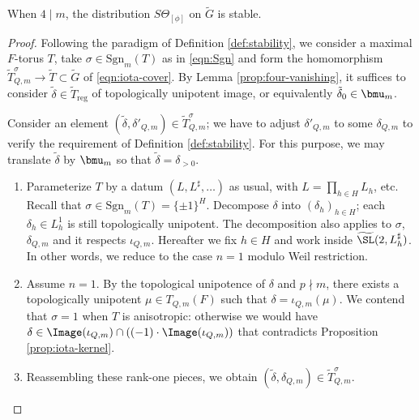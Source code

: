 \documentclass[a4paper,10pt]{article}
\begin{document}
\begin{theorem}\label{prop:stability-2}
	When $4 \mid m$, the distribution $S\Theta_{[\phi]}$ on $\tilde{G}$ is stable.
\end{theorem}
\begin{proof}
	Following the paradigm of Definition \ref{def:stability}, we consider a maximal $F$-torus $T$, take $\sigma \in \text{Sgn}_m(T)$ as in \eqref{eqn:Sgn} and form the homomorphism $\tilde{T}^\sigma_{Q,m} \to \tilde{T} \subset \tilde{G}$ of \eqref{eqn:iota-cover}. By Lemma \ref{prop:four-vanishing}, it suffices to consider $\tilde{\delta} \in \tilde{T}_\text{reg}$ of topologically unipotent image, or equivalently $\tilde{\delta}_0 \in \bmu_m$.

	Consider an element $(\tilde{\delta}, \delta'_{Q,m}) \in \tilde{T}^\sigma_{Q,m}$; we have to adjust $\delta'_{Q,m}$ to some $\delta_{Q,m}$ to verify the requirement of Definition \ref{def:stability}. For this purpose, we may translate $\tilde{\delta}$ by $\bmu_m$ so that $\tilde{\delta} = \delta_{>0}$.
	\begin{enumerate}
		\item Parameterize $T$ by a datum $(L, L^\sharp, \ldots)$ as usual, with $L = \prod_{h \in H} L_h$, etc. Recall that $\sigma \in \text{Sgn}_m(T) = \{\pm 1\}^H$. Decompose $\delta$ into $(\delta_h)_{h \in H}$; each $\delta_h \in L^1_h$ is still topologically unipotent. The decomposition also applies to $\sigma$, $\delta_{Q,m}$ and it respects $\iota_{Q,m}$. Hereafter we fix $h \in H$ and work inside $\widetilde{\SL}(2, L_h^\sharp)$. In other words, we reduce to the case $n=1$ modulo Weil restriction.
		\item Assume $n=1$. By the topological unipotence of $\delta$ and $p \nmid m$, there exists a topologically unipotent $\mu \in T_{Q,m}(F)$ such that $\delta = \iota_{Q,m}(\mu)$. We contend that $\sigma=1$ when $T$ is anisotropic: otherwise we would have $\delta \in \Image(\iota_{Q,m}) \cap ((-1) \cdot \Image(\iota_{Q,m}))$ that contradicts Proposition \ref{prop:iota-kernel}.
		\item Reassembling these rank-one pieces, we obtain $(\tilde{\delta}, \delta_{Q,m}) \in \tilde{T}^\sigma_{Q,m}$.
	\end{enumerate}


\end{proof}
\end{document}
